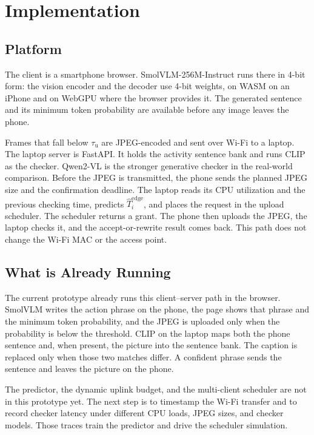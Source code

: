 \section{Implementation}

\subsection{Platform}

The client is a smartphone browser. SmolVLM-256M-Instruct runs there in
4-bit form: the vision encoder and the decoder use 4-bit weights, on WASM
on an iPhone and on WebGPU where the browser provides it. The generated
sentence and its minimum token probability are available before any image
leaves the phone.

Frames that fall below $\tau_{\mathrm{u}}$ are JPEG-encoded and sent over
Wi-Fi to a laptop. The laptop server is FastAPI. It holds the activity
sentence bank and runs CLIP as the checker. Qwen2-VL is the stronger
generative checker in the real-world comparison. Before the JPEG is
transmitted, the phone sends the planned JPEG size and the confirmation
deadline. The laptop reads its CPU utilization and the previous checking
time, predicts $\hat T_i^{\mathrm{edge}}$, and places the request in the
upload scheduler. The scheduler returns a grant. The phone then uploads the
JPEG, the laptop checks it, and the accept-or-rewrite result comes back.
This path does not change the Wi-Fi MAC or the access point.

\subsection{What is Already Running}

The current prototype already runs this client--server path in the browser.
SmolVLM writes the action phrase on the phone, the page shows that phrase
and the minimum token probability, and the JPEG is uploaded only when the
probability is below the threshold. CLIP on the laptop maps both the phone
sentence and, when present, the picture into the sentence bank. The caption
is replaced only when those two matches differ. A confident phrase sends
the sentence and leaves the picture on the phone.

The predictor, the dynamic uplink budget, and the multi-client scheduler
are not in this prototype yet. The next step is to timestamp the Wi-Fi
transfer and to record checker latency under different CPU loads, JPEG
sizes, and checker models. Those traces train the predictor and drive the
scheduler simulation.

